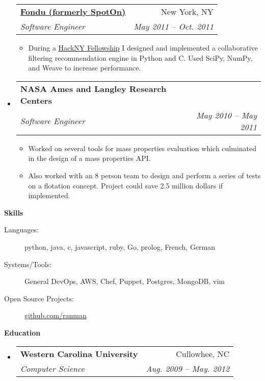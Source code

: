 \documentclass[letterpaper,8pt]{article}
\makeatletter
\newcommand{\resitem}[1]{\item #1 \vspace{-2pt}}
\newcommand{\resheading}[1]{{\large \colorbox{mygrey}{\begin{minipage}{\textwidth}{\textbf{#1 \vphantom{p\^{E}}}}\end{minipage}}}}
\newcommand{\ressubheading}[4]{
\begin{tabular*}{2.0in}{l@{\extracolsep{\fill}}r}
		\textbf{#1} & #2 \\
		\textit{#3} & \textit{#4} \\
\end{tabular*}\vspace{-6pt}}
\makeatother
\begin{document}
\begin{itemize}
    \ressubheading{\href{http://fondu.com/}{Fondu (formerly SpotOn)}}{New York, NY}{Software Engineer}{May 2011 -- Oct. 2011}
    \begin{itemize}
        \resitem{During a \href{http://hackny.org/}{HackNY Fellowship} I designed and implemented a collaborative filtering recommendation engine in Python and C. Used SciPy, NumPy, and Weave to increase performance.}
    \end{itemize}
\item[]
   \ressubheading{NASA Ames and Langley Research Centers}{}{Software Engineer}{May 2010 -- May 2011}
   \begin{itemize}
      \resitem{Worked on several tools for mass properties evaluation which culminated in the design of a mass properties API.}
      \resitem{Also worked with an 8 person team to design and perform a series of tests on a flotation concept. Project could save 2.5 million dollars if implemented.}
   \end{itemize}
\end{itemize}
\resheading{Skills}
\begin{description}
\item[Languages:]
python, java, c, javascript, ruby, Go, prolog, French, German
\item[Systems/Tools:]
General DevOps, AWS, Chef, Puppet, Postgres, MongoDB, vim
\item[Open Source Projects:]
\href{https://github.com/ranman/}{github.com/ranman}
\end{description}
\resheading{Education}
\begin{itemize}
\item
   \ressubheading{Western Carolina University}{Cullowhee, NC}{Computer Science}{Aug. 2009 -- May. 2012}
\end{itemize}
\end{document}
